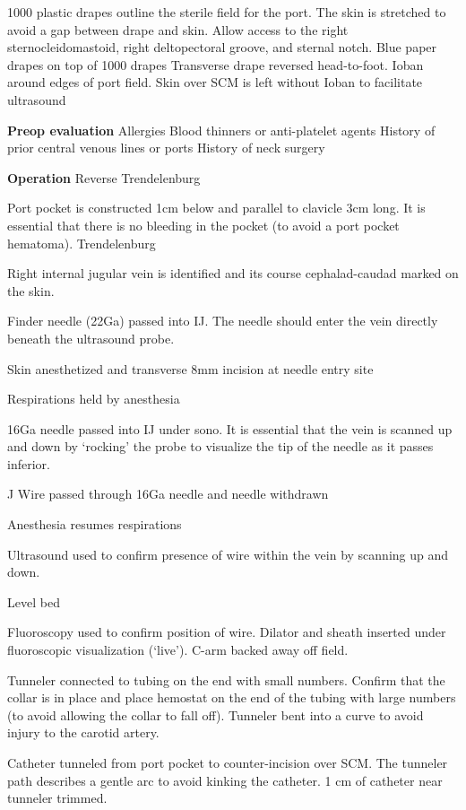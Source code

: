\documentclass[
]{book}
\begin{document}
1000 plastic drapes outline the sterile field for the port. The skin is stretched to avoid a gap between drape and skin. Allow access to the right sternocleidomastoid, right deltopectoral groove, and sternal notch.
Blue paper drapes on top of 1000 drapes
Transverse drape reversed head-to-foot.
Ioban around edges of port field. Skin over SCM is left without Ioban to facilitate ultrasound

\textbf{Preop evaluation}
Allergies
Blood thinners or anti-platelet agents
History of prior central venous lines or ports
History of neck surgery

\textbf{Operation}
Reverse Trendelenburg

Port pocket is constructed 1cm below and parallel to clavicle 3cm long. It is essential that there is no bleeding in the pocket (to avoid a port pocket hematoma).
Trendelenburg

Right internal jugular vein is identified and its course cephalad-caudad marked on the skin.

Finder needle (22Ga) passed into IJ. The needle should enter the vein directly beneath the ultrasound probe.

Skin anesthetized and transverse 8mm incision at needle entry site

Respirations held by anesthesia

16Ga needle passed into IJ under sono. It is essential that the vein is scanned up and down by `rocking' the probe to visualize the tip of the needle as it passes inferior.

J Wire passed through 16Ga needle and needle withdrawn

Anesthesia resumes respirations

Ultrasound used to confirm presence of wire within the vein by scanning up and down.

Level bed

Fluoroscopy used to confirm position of wire. Dilator and sheath inserted under fluoroscopic visualization (`live'). C-arm backed away off field.

Tunneler connected to tubing on the end with small numbers. Confirm that the collar is in place and place hemostat on the end of the tubing with large numbers (to avoid allowing the collar to fall off). Tunneler bent into a curve to avoid injury to the carotid artery.

Catheter tunneled from port pocket to counter-incision over SCM. The tunneler path describes a gentle arc to avoid kinking the catheter. 1 cm of catheter near tunneler trimmed.
\end{document}
